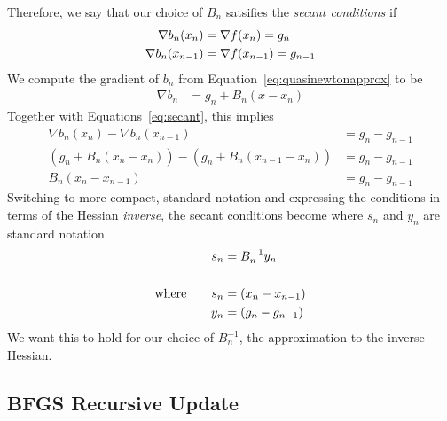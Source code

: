 \documentclass[a4paper,12pt]{scrartcl}
\theoremstyle{definition}
\theoremstyle{remark}
\begin{document}
Therefore, we say that our choice of $B_n$ satsifies the \emph{secant
conditions} if
\begin{align}
  \nabla b_n(x_n) &= \nabla f(x_n) = g_n \label{eq:secant}\\
  \nabla b_n(x_{n-1}) &= \nabla f(x_{n-1}) = g_{n-1}\notag
\end{align}
We compute the gradient of $b_n$ from
Equation~\ref{eq:quasinewtonapprox} to be
\begin{align*}
  \nabla b_n &= g_n + B_n(x-x_n)
\end{align*}
Together with Equations~\ref{eq:secant}, this implies
\begin{align*}
  \nabla b_n(x_n) - \nabla b_n(x_{n-1})
    &= g_n - g_{n-1} \\
  (g_n + B_n(x_n-x_n)) - (g_n + B_n(x_{n-1}-x_n))
  &= g_n - g_{n-1} \\
  B_n(x_{n}-x_{n-1}) &= g_n - g_{n-1}
\end{align*}
Switching to more compact, standard notation and expressing the
conditions in terms of the Hessian \emph{inverse}, the secant conditions
become where $s_n$ and $y_n$ are standard notation
\begin{align}
  s_n &= B_n^{-1}y_n \label{eq:secant_compact}\\\notag\\
  \text{where} \qquad
  s_n &= (x_{n}-x_{n-1}) \notag \\
  y_n &= (g_{n}-g_{n-1}) \notag
\end{align}
We want this to hold for our choice of $B^{-1}_n$, the approximation to
the inverse Hessian.

\subsection{BFGS Recursive Update}
\end{document}
